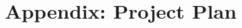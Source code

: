 \documentclass[tex/appendix.tex]{subfiles}
\begin{document}
    \appendix
    \label{app:project_plan}
    \section{Appendix: Project Plan}
    
\end{document}
